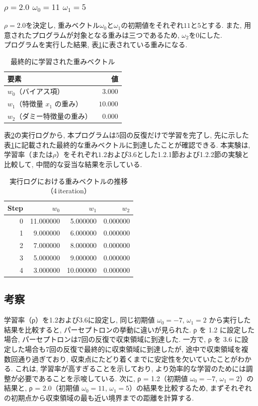 \documentclass[a4j, 12pt]{jarticle}
\begin{document}
\subsubsection{$\rho=2.0$ $\omega_0=11$ $\omega_1=5$}
$\rho=2.0$を決定し, 重みベクトル$\omega_0$と$\omega_1$の初期値をそれぞれ$11$と$5$とする. また, 用意されたプログラムが対象となる重みは三つであるため, $\omega_2$を0にした. \\
プログラムを実行した結果, 表\ref{p20finalweights}に表されている重みになる. 
\begin{table}[H]
  \centering
  \caption{最終的に学習された重みベクトル}\label{p20finalweights}
  \begin{tabular}{l r}
    \hline
    要素 & 値 \\
    \hline
    $w_0$（バイアス項） & $3.000$ \\
    $w_1$（特徴量 $x_1$ の重み） & $10.000$ \\
    $w_2$（ダミー特徴量の重み）   & $0.000$ \\
    \hline
  \end{tabular}
\end{table}
表\ref{p20logs}の実行ログから, 本プログラムは5回の反復だけで学習を完了し, 先に示した表\ref{p20finalweights}に記載された最終的な重みベクトルに到達したことが確認できる. 本実験は, 学習率（または$\rho$）をそれぞれ$1.2$および$3.6$とした1.2.1節および1.2.2節の実験と比較して, 中間的な妥当な結果を示している. 
\begin{table}[H]
  \centering
  \caption{実行ログにおける重みベクトルの推移（4\,iteration）}\label{p20logs}
  \begin{tabular}{r|rrr}
    \hline
    Step & $w_0$ & $w_1$ & $w_2$ \\
    \hline
     0 & 11.000000 & 5.000000 & 0.000000 \\
     1 &  9.000000 & 6.000000 & 0.000000 \\
     2 &  7.000000 & 8.000000 & 0.000000 \\
     3 &  5.000000 & 9.000000 & 0.000000 \\
     4 &  3.000000 & 10.000000 & 0.000000 \\
    \hline
  \end{tabular}
\end{table}
\subsection{考察}
学習率（ρ）を1.2および3.6に設定し, 同じ初期値 $\omega_0 = -7$, $\omega_1 = 2$ から実行した結果を比較すると, パーセプトロンの挙動に違いが見られた. ρ を 1.2 に設定した場合, パーセプトロンは7回の反復で収束領域に到達した. 一方で, ρ を 3.6 に設定した場合も7回の反復で最終的に収束領域に到達したが, 途中で収束領域を複数回通り過ぎており, 収束点にたどり着くまでに安定性を欠いていたことがわかる. これは, 学習率が高すぎることを示しており, より効率的な学習のためには調整が必要であることを示唆している. 
次に, ρ = 1.2（初期値 $\omega_0 = -7$, $\omega_1 = 2$）の結果と, ρ = 2.0（初期値 $\omega_0 = 11$, $\omega_1 = 5$）の結果を比較するため, まずそれぞれの初期点から収束領域の最も近い境界までの距離を計算する. 
\end{document}

